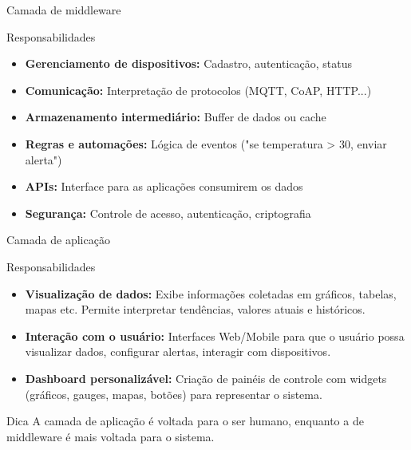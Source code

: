\documentclass[aspectratio=169,xcolor=dvipsnames]{beamer}
\begin{document}
\begin{frame}{Camada de middleware}
    \begin{exampleblock}{Responsabilidades}
    \begin{itemize}
   \item \textbf{Gerenciamento de dispositivos:}	Cadastro, autenticação, status
    \item    \textbf{Comunicação:}	Interpretação de protocolos (MQTT, CoAP, HTTP...)
    \item    \textbf{Armazenamento intermediário:}	Buffer de dados ou cache
    \item    \textbf{Regras e automações:}	Lógica de eventos ("se temperatura > 30, enviar alerta")
    \item    \textbf{APIs:}	Interface para as aplicações consumirem os dados
     \item   \textbf{Segurança:}	Controle de acesso, autenticação, criptografia
    \end{itemize}
        \end{exampleblock} 
\end{frame}

\begin{frame}{Camada de aplicação}

    \begin{exampleblock}{Responsabilidades}
    \begin{itemize}
    \item \textbf{Visualização de dados:}	Exibe informações coletadas em gráficos, tabelas, mapas etc. Permite interpretar tendências, valores atuais e históricos.
\item \textbf{Interação com o usuário:}	Interfaces Web/Mobile para que o usuário possa visualizar dados, configurar alertas, interagir com dispositivos.
\item \textbf{Dashboard personalizável:} Criação de painéis de controle com widgets (gráficos, gauges, mapas, botões) para representar o sistema.
    \end{itemize}
    \end{exampleblock} 
    \pause
      \begin{alertblock}{Dica}
A camada de aplicação é voltada para o ser humano, enquanto a de middleware é mais voltada para o sistema.
  \end{alertblock}
\end{frame}
\end{document}
